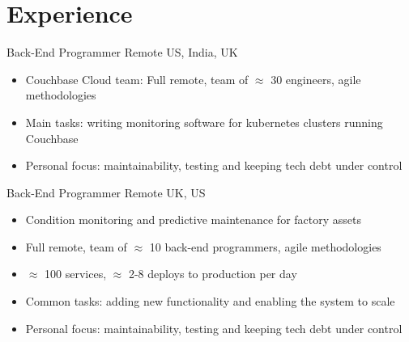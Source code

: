 \documentclass[12pt,a4paper]{moderncv}
\begin{document}


\newpage

\section{Experience}

  {Back-End Programmer}
  {\href{https://www.couchbase.com/}{\color{link}{Couchbase}}}
  {Remote}
  {US, India, UK}
  {
  \begin{itemize}
    \item Couchbase Cloud team: Full remote, team of $\approx$ 30 engineers, agile methodologies
    \item Main tasks: writing monitoring software for kubernetes clusters running Couchbase
    \item Personal focus: maintainability, testing and keeping tech debt under control
  \end{itemize}
}

  {Back-End Programmer}
  {\href{https://www.senseye.io}{\color{link}{Senseye}}}
  {Remote}
  {UK, US}
  {
  \begin{itemize}
    \item Condition monitoring and predictive maintenance for factory assets
    \item Full remote, team of $\approx$ 10 back-end programmers, agile methodologies
    \item $\approx$ 100 services, $\approx$ 2-8 deploys to production per day
    \item Common tasks:
      adding new functionality
      and enabling the system to scale
    \item Personal focus: maintainability, testing and keeping tech debt under control
  \end{itemize}
}
\end{document}
